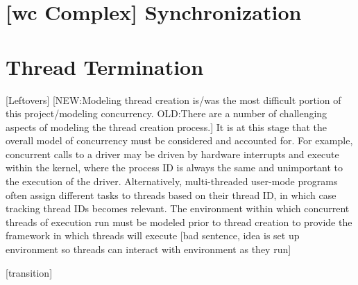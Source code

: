 \section{[wc Complex] Synchronization}

\section{Thread Termination}

[Leftovers]
[NEW:Modeling thread creation is/was the most difficult portion of
this project/modeling concurrency.  OLD:There are a number of
challenging aspects of modeling the thread creation process.]  It is
at this stage that the overall model of 
concurrency must be considered and accounted for.  For example,
concurrent calls to a driver may be driven by hardware interrupts and
execute within the kernel, where the process ID is always the same and
unimportant to the execution of the driver.  Alternatively,
multi-threaded user-mode programs often assign different tasks to
threads based on their thread ID, in which case tracking thread IDs
becomes relevant.  The environment within which concurrent threads of
execution run must be modeled prior to thread creation to provide the
framework in which threads will execute [bad sentence, idea is set up
environment so threads can interact with environment as they run] 

[transition]


